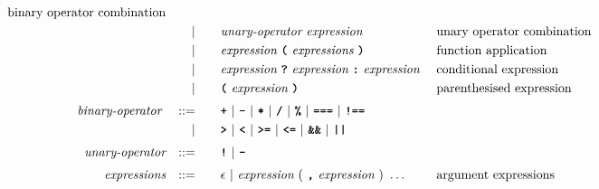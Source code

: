 \begin{alignat*}{9}
                                                           && \textrm{binary operator combination}\\
&&                       && |   &\quad &&   \textit{unary-operator} \ 
                                            \textit{expression}
                                                           && \textrm{unary operator combination}\\
&&                       && |   &\quad &&   \textit{expression} \ 
                                            \textbf{\texttt{(}}\ \textit{expressions}\
                                            \textbf{\texttt{)}}
                                                           && \textrm{function application}\\
&&                       && |   &\quad &&   \textit{expression} \ \textbf{\texttt{?}}\ 
                                            \textit{expression}
                                            \ \textbf{\texttt{:}}\
                                            \textit{expression}\
                                                           && \textrm{conditional expression}\\
&&                       && |   &\quad &&  \textbf{\texttt{(}}\  \textit{expression} \ 
                                            \textbf{\texttt{)}} && \textrm{parenthesised expression}\\[1mm]
&& \textit{binary-operator}    \ 
                        && ::= &\quad && \textbf{\texttt{+}}\ |\ \textbf{\texttt{-}}\ |\ \textbf{\texttt{*}}\ |\ \textbf{\texttt{/}}\ |\ \textbf{\texttt{\%}}\ |\ 
                                   \textbf{\texttt{===}}\ |\ \textbf{\texttt{!==}}\ \\
&&                       && |  &\quad &&  \texttt{\textbf{>}}\ |\ \texttt{\textbf{<}}\ |\ \texttt{\textbf{>=}}\ |\ \texttt{\textbf{<=}}\
                                          |\ \textbf{\texttt{\&\&}}\ |\ \texttt{\textbf{||}}\  \\[1mm]
&& \textit{unary-operator}    
                        && ::= &\quad && \textbf{\texttt{!}}\ |\ \textbf{\texttt{-}}\\[1mm]
&& \textit{expressions}  && ::= &\quad && \epsilon\ | \ \textit{expression}\ (
                                                               \ \textbf{\texttt{,}} \
                                                                 \textit{expression} \ 
                                                                      )\ \ldots
                                                            && \textrm{argument expressions} 
\end{alignat*}

\newpage



















